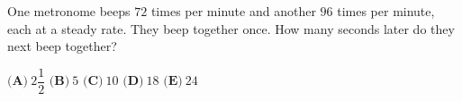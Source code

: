 One metronome beeps $72$ times per minute and another $96$ times per minute, each at a steady rate. They beep together once. How many seconds later do they next beep together?

$\textbf{(A)}\ $$2\dfrac12$ \qquad $\textbf{(B)}\ $$5$ \qquad $\textbf{(C)}\ $$10$ \qquad $\textbf{(D)}\ $$18$ \qquad $\textbf{(E)}\ $$24$
